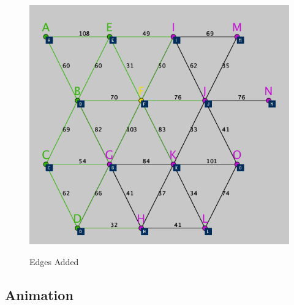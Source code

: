 \documentclass[11pt,a4paper]{article}
\begin{document}
\begin{figure}[h]
	\centering
	\caption{Edges Added}
	\vspace{10pt}
	\includegraphics[scale=0.6]{graph3.png}
	\label{3}
\end{figure}

\subsection*{Animation}

\newpage


\end{document}
